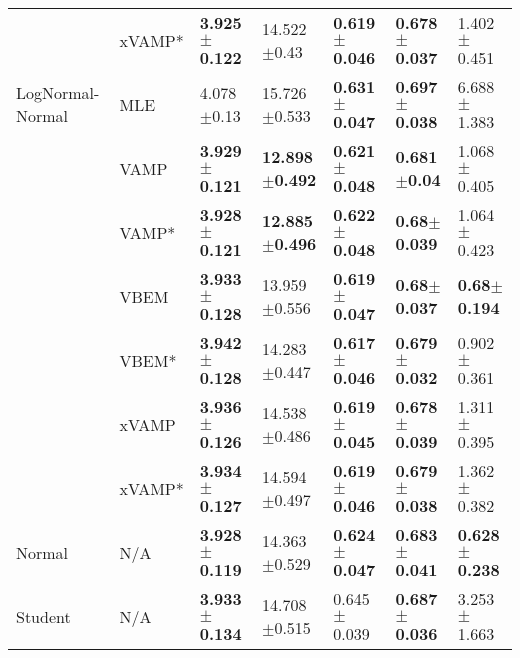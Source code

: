 \begin{tabular}{lllllll}
        & xVAMP* &  \textbf{3.925$\pm$0.122} &            14.522$\pm$0.43 &  \textbf{0.619$\pm$0.046} &  \textbf{0.678$\pm$0.037} &           1.402$\pm$0.451 \\
LogNormal-Normal & MLE &            4.078$\pm$0.13 &           15.726$\pm$0.533 &  \textbf{0.631$\pm$0.047} &  \textbf{0.697$\pm$0.038} &           6.688$\pm$1.383 \\
        & VAMP &  \textbf{3.929$\pm$0.121} &  \textbf{12.898$\pm$0.492} &  \textbf{0.621$\pm$0.048} &   \textbf{0.681$\pm$0.04} &           1.068$\pm$0.405 \\
        & VAMP* &  \textbf{3.928$\pm$0.121} &  \textbf{12.885$\pm$0.496} &  \textbf{0.622$\pm$0.048} &   \textbf{0.68$\pm$0.039} &           1.064$\pm$0.423 \\
        & VBEM &  \textbf{3.933$\pm$0.128} &           13.959$\pm$0.556 &  \textbf{0.619$\pm$0.047} &   \textbf{0.68$\pm$0.037} &   \textbf{0.68$\pm$0.194} \\
        & VBEM* &  \textbf{3.942$\pm$0.128} &           14.283$\pm$0.447 &  \textbf{0.617$\pm$0.046} &  \textbf{0.679$\pm$0.032} &           0.902$\pm$0.361 \\
        & xVAMP &  \textbf{3.936$\pm$0.126} &           14.538$\pm$0.486 &  \textbf{0.619$\pm$0.045} &  \textbf{0.678$\pm$0.039} &           1.311$\pm$0.395 \\
        & xVAMP* &  \textbf{3.934$\pm$0.127} &           14.594$\pm$0.497 &  \textbf{0.619$\pm$0.046} &  \textbf{0.679$\pm$0.038} &           1.362$\pm$0.382 \\
Normal & N/A &  \textbf{3.928$\pm$0.119} &           14.363$\pm$0.529 &  \textbf{0.624$\pm$0.047} &  \textbf{0.683$\pm$0.041} &  \textbf{0.628$\pm$0.238} \\
Student & N/A &  \textbf{3.933$\pm$0.134} &           14.708$\pm$0.515 &           0.645$\pm$0.039 &  \textbf{0.687$\pm$0.036} &           3.253$\pm$1.663 \\
\bottomrule
\end{tabular}


